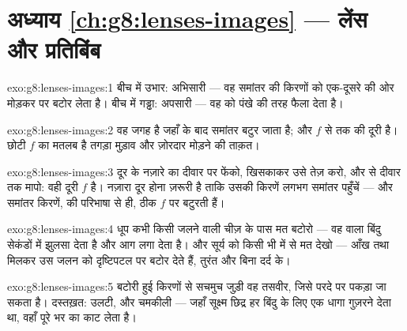 \section*{अध्याय \ref{ch:g8:lenses-images} --- लेंस और प्रतिबिंब}

\begin{solution}{exo:g8:lenses-images:1}
बीच में उभार: अभिसारी --- वह समांतर  की किरणों को एक-दूसरे की
ओर मोड़कर  पर बटोर लेता है। बीच में गड्ढा: अपसारी --- वह 
को पंखे की तरह फैला देता है।
\end{solution}

\begin{solution}{exo:g8:lenses-images:2}
 वह जगह है जहाँ  के बाद समांतर  बटुर जाता है; और  $f$  से  तक की दूरी है। छोटी $f$ का मतलब है तगड़ा मुड़ाव
और ज़ोरदार मोड़ने की ताक़त।
\end{solution}

\begin{solution}{exo:g8:lenses-images:3}
दूर के नज़ारे का  दीवार पर फेंको,  खिसकाकर उसे तेज़ करो,
और  से दीवार तक मापो: वही दूरी $f$ है। नज़ारा दूर होना ज़रूरी है
ताकि उसकी किरणें लगभग समांतर पहुँचें --- और समांतर किरणें,  की
परिभाषा से ही, ठीक $f$ पर बटुरती हैं।
\end{solution}

\begin{solution}{exo:g8:lenses-images:4}
धूप कभी किसी जलने वाली चीज़ के पास मत बटोरो --- वह  वाला बिंदु
सेकंडों में झुलसा देता है और आग लगा देता है। और सूर्य को किसी भी 
में से मत देखो --- आँख तथा  मिलकर उस जलन को दृष्टिपटल पर बटोर देते
हैं, तुरंत और बिना दर्द के।
\end{solution}

\begin{solution}{exo:g8:lenses-images:5}
बटोरी हुई किरणों से सचमुच जुड़ी वह तसवीर, जिसे परदे पर पकड़ा जा सकता
है। दस्तख़त: उलटी, और चमकीली --- जहाँ सूक्ष्म छिद्र हर बिंदु के लिए एक
धागा गुज़रने देता था, वहाँ  पूरे  भर का  काट लेता है।
\end{solution}

